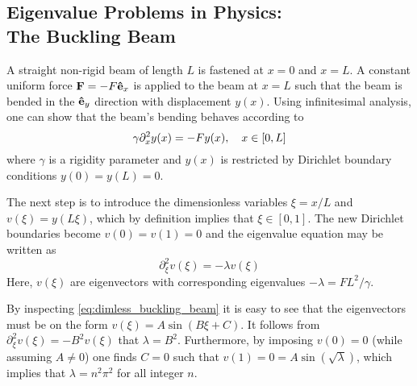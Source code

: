\documentclass[reprint,english]{revtex4-1}
\begin{document}
\subsection{Eigenvalue Problems in Physics:\\The Buckling Beam}
A straight non-rigid beam of length \(L\) is fastened at \(x=0\) and \(x=L\). A constant uniform force \(\vb{F}=-F\vu{e}_x\) is applied to the beam at \(x=L\) such that the beam is bended in the \(\vu{e}_y\) direction with displacement \(y(x)\). Using infinitesimal analysis, one can show that the beam's bending behaves according to
\begin{equation}\label{eq:initial_buckling_beam}
\gamma\partial_x^2y(x)=-Fy(x)\qc x\in[0,L]
\end{equation}
where \(\gamma\) is a rigidity parameter and \(y(x)\) is restricted by Dirichlet boundary conditions \(y(0)=y(L)=0\).

The next step is to introduce the dimensionless variables \(\xi=x/L\) and \(v(\xi)=y(L\xi)\), which by definition implies that \(\xi\in[0,1]\). The new Dirichlet boundaries become \(v(0)=v(1)=0\) and the eigenvalue equation may be written as
\begin{equation}\label{eq:dimless_buckling_beam}
\partial_{\xi}^2v(\xi)=-\lambda v(\xi)
\end{equation}
Here, \(v(\xi)\) are eigenvectors with corresponding eigenvalues \(-\lambda=FL^2/\gamma\).

By inspecting \eqref{eq:dimless_buckling_beam} it is easy to see that the eigenvectors must be on the form \(v(\xi)=A\sin(B\xi+C)\). It follows from \(\partial_\xi^2v(\xi)=-B^2 v(\xi)\) that \(\lambda=B^2\). Furthermore, by imposing \(v(0)=0\) (while assuming \(A\neq0\)) one finds \(C=0\) such that \(v(1)=0=A\sin(\sqrt{\lambda})\), which implies that \(\lambda=n^2\pi^2\) for all integer \(n\).
\end{document}
